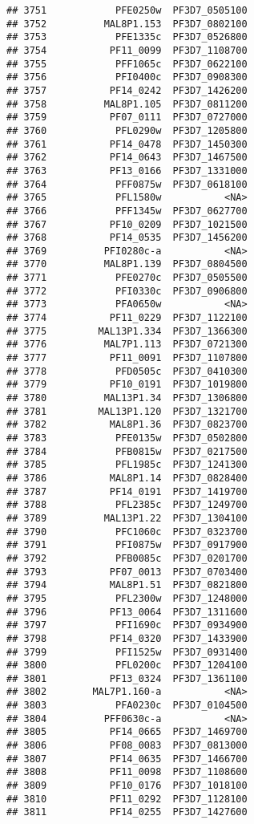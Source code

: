 \documentclass[12pt, a4paper]{article}\usepackage[]{graphicx}\usepackage[]{color}
\makeatletter
\newenvironment{kframe}{%
 \def\at@end@of@kframe{}%
 \ifinner\ifhmode%
  \def\at@end@of@kframe{\end{minipage}}%
  \begin{minipage}{\columnwidth}%
 \fi\fi%
 \def\FrameCommand##1{\hskip\@totalleftmargin \hskip-\fboxsep
 \colorbox{shadecolor}{##1}\hskip-\fboxsep
     \hskip-\linewidth \hskip-\@totalleftmargin \hskip\columnwidth}%
 \MakeFramed {\advance\hsize-\width
   \@totalleftmargin\z@ \linewidth\hsize
   \@setminipage}}%
 {\par\unskip\endMakeFramed%
 \at@end@of@kframe}
\newenvironment{knitrout}{}{} %
\makeatother
\begin{document}
\begin{knitrout}
\begin{kframe}
\begin{verbatim}
## 3751            PFE0250w  PF3D7_0505100
## 3752          MAL8P1.153  PF3D7_0802100
## 3753            PFE1335c  PF3D7_0526800
## 3754           PF11_0099  PF3D7_1108700
## 3755            PFF1065c  PF3D7_0622100
## 3756            PFI0400c  PF3D7_0908300
## 3757           PF14_0242  PF3D7_1426200
## 3758          MAL8P1.105  PF3D7_0811200
## 3759           PF07_0111  PF3D7_0727000
## 3760            PFL0290w  PF3D7_1205800
## 3761           PF14_0478  PF3D7_1450300
## 3762           PF14_0643  PF3D7_1467500
## 3763           PF13_0166  PF3D7_1331000
## 3764            PFF0875w  PF3D7_0618100
## 3765            PFL1580w           <NA>
## 3766            PFF1345w  PF3D7_0627700
## 3767           PF10_0209  PF3D7_1021500
## 3768           PF14_0535  PF3D7_1456200
## 3769          PFI0280c-a           <NA>
## 3770          MAL8P1.139  PF3D7_0804500
## 3771            PFE0270c  PF3D7_0505500
## 3772            PFI0330c  PF3D7_0906800
## 3773            PFA0650w           <NA>
## 3774           PF11_0229  PF3D7_1122100
## 3775         MAL13P1.334  PF3D7_1366300
## 3776          MAL7P1.113  PF3D7_0721300
## 3777           PF11_0091  PF3D7_1107800
## 3778            PFD0505c  PF3D7_0410300
## 3779           PF10_0191  PF3D7_1019800
## 3780          MAL13P1.34  PF3D7_1306800
## 3781         MAL13P1.120  PF3D7_1321700
## 3782           MAL8P1.36  PF3D7_0823700
## 3783            PFE0135w  PF3D7_0502800
## 3784            PFB0815w  PF3D7_0217500
## 3785            PFL1985c  PF3D7_1241300
## 3786           MAL8P1.14  PF3D7_0828400
## 3787           PF14_0191  PF3D7_1419700
## 3788            PFL2385c  PF3D7_1249700
## 3789          MAL13P1.22  PF3D7_1304100
## 3790            PFC1060c  PF3D7_0323700
## 3791            PFI0875w  PF3D7_0917900
## 3792            PFB0085c  PF3D7_0201700
## 3793           PF07_0013  PF3D7_0703400
## 3794           MAL8P1.51  PF3D7_0821800
## 3795            PFL2300w  PF3D7_1248000
## 3796           PF13_0064  PF3D7_1311600
## 3797            PFI1690c  PF3D7_0934900
## 3798           PF14_0320  PF3D7_1433900
## 3799            PFI1525w  PF3D7_0931400
## 3800            PFL0200c  PF3D7_1204100
## 3801           PF13_0324  PF3D7_1361100
## 3802        MAL7P1.160-a           <NA>
## 3803            PFA0230c  PF3D7_0104500
## 3804          PFF0630c-a           <NA>
## 3805           PF14_0665  PF3D7_1469700
## 3806           PF08_0083  PF3D7_0813000
## 3807           PF14_0635  PF3D7_1466700
## 3808           PF11_0098  PF3D7_1108600
## 3809           PF10_0176  PF3D7_1018100
## 3810           PF11_0292  PF3D7_1128100
## 3811           PF14_0255  PF3D7_1427600

\end{verbatim}
\end{kframe}
\end{knitrout}
\end{document}
